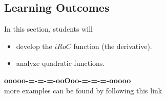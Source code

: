 \documentclass{ximera}
\begin{document}
\subsection*{Learning Outcomes}

\begin{sectionOutcomes}
In this section, students will 

\begin{itemize}
\item develop the $iRoC$ function (the derivative).
\item analyze quadratic functions.
\end{itemize}
\end{sectionOutcomes}










\begin{center}
\textbf{\textcolor{green!50!black}{ooooo-=-=-=-ooOoo-=-=-=-ooooo}} \\

more examples can be found by following this link\\ 

\end{center}
\end{document}
